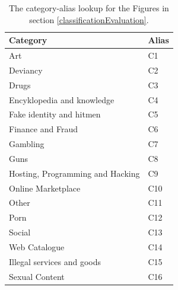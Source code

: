 \begin{table}[h]
\centering
\begin{tabular}{@{}ll@{}}
\toprule
\rowcolor[HTML]{EEF9FB} 
{\color[HTML]{000000} \textbf{Category}} & {\color[HTML]{000000} \textbf{Alias}} \\ \midrule
\rowcolor[HTML]{DAE8E5} 
{\color[HTML]{000000} Art} & {\color[HTML]{000000} C1} \\
\rowcolor[HTML]{EEF9FB} 
{\color[HTML]{000000} Deviancy} & {\color[HTML]{000000} C2} \\
\rowcolor[HTML]{DAE8E5} 
{\color[HTML]{000000} Drugs} & {\color[HTML]{000000} C3} \\
\rowcolor[HTML]{EEF9FB} 
{\color[HTML]{000000} Encyklopedia and knowledge} & {\color[HTML]{000000} C4} \\
\rowcolor[HTML]{DAE8E5} 
{\color[HTML]{000000} Fake identity and hitmen} & {\color[HTML]{000000} C5} \\
\rowcolor[HTML]{EEF9FB} 
{\color[HTML]{000000} Finance and Fraud} & {\color[HTML]{000000} C6} \\
\rowcolor[HTML]{DAE8E5} 
{\color[HTML]{000000} Gambling} & {\color[HTML]{000000} C7} \\
\rowcolor[HTML]{EEF9FB} 
{\color[HTML]{000000} Guns} & {\color[HTML]{000000} C8} \\
\rowcolor[HTML]{DAE8E5} 
{\color[HTML]{000000} Hosting, Programming and Hacking} & {\color[HTML]{000000} C9} \\
\rowcolor[HTML]{EEF9FB} 
{\color[HTML]{000000} Online Marketplace} & {\color[HTML]{000000} C10} \\
\rowcolor[HTML]{DAE8E5} 
{\color[HTML]{000000} Other} & {\color[HTML]{000000} C11} \\
\rowcolor[HTML]{EEF9FB} 
{\color[HTML]{000000} Porn} & {\color[HTML]{000000} C12} \\
\rowcolor[HTML]{DAE8E5} 
{\color[HTML]{000000} Social} & {\color[HTML]{000000} C13} \\
\rowcolor[HTML]{EEF9FB} 
{\color[HTML]{000000} Web Catalogue} & {\color[HTML]{000000} C14} \\
\rowcolor[HTML]{DAE8E5} 
{\color[HTML]{000000} Illegal services and goods} & {\color[HTML]{000000} C15} \\
\rowcolor[HTML]{EEF9FB} 
{\color[HTML]{000000} Sexual Content} & {\color[HTML]{000000} C16} \\ \bottomrule
\end{tabular}
\caption{The category-alias lookup for the Figures in section \ref{classificationEvaluation}.}
\label{categoryLegend}
\end{table}
